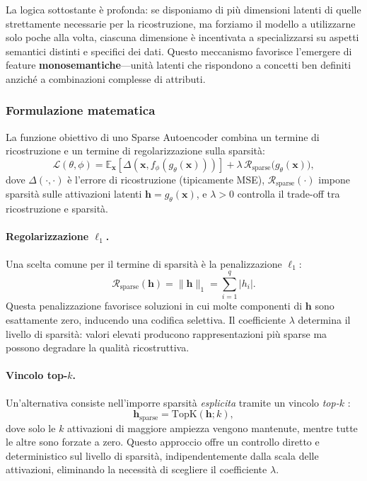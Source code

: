 La logica sottostante è profonda: se disponiamo di più dimensioni latenti di quelle strettamente necessarie per la ricostruzione, ma forziamo il modello a utilizzarne solo poche alla volta, ciascuna dimensione è incentivata a specializzarsi su aspetti semantici distinti e specifici dei dati. Questo meccanismo favorisce l'emergere di feature \textbf{monosemantiche}—unità latenti che rispondono a concetti ben definiti anziché a combinazioni complesse di attributi.


\subsubsection{Formulazione matematica}

La funzione obiettivo di uno Sparse Autoencoder combina un termine di ricostruzione e un termine di regolarizzazione sulla sparsità:
\begin{equation}
    \mathcal{L}(\theta, \phi)
    =
    \mathbb{E}_{\mathbf{x}}
    \left[
        \Delta\!\left(\mathbf{x}, f_\phi(g_\theta(\mathbf{x}))\right)
    \right]
    +
    \lambda \, \mathcal{R}_\text{sparse}\big(g_\theta(\mathbf{x})\big),
    \label{eq:sae_loss}
\end{equation}
dove $\Delta(\cdot, \cdot)$ è l'errore di ricostruzione (tipicamente MSE), $\mathcal{R}_\text{sparse}(\cdot)$ impone sparsità sulle attivazioni latenti $\mathbf{h} = g_\theta(\mathbf{x})$, e $\lambda > 0$ controlla il trade-off tra ricostruzione e sparsità.

\paragraph{Regolarizzazione $\ell_1$.} 
Una scelta comune per il termine di sparsità è la penalizzazione $\ell_1$:
\begin{equation}
    \mathcal{R}_\text{sparse}(\mathbf{h}) = \|\mathbf{h}\|_1 = \sum_{i=1}^{q} |h_i|.
    \label{eq:l1_sparsity}
\end{equation}
Questa penalizzazione favorisce soluzioni in cui molte componenti di $\mathbf{h}$ sono esattamente zero, inducendo una codifica selettiva. Il coefficiente $\lambda$ determina il livello di sparsità: valori elevati producono rappresentazioni più sparse ma possono degradare la qualità ricostruttiva.

\paragraph{Vincolo top-$k$.}
Un'alternativa consiste nell'imporre sparsità \textit{esplicita} tramite un vincolo \textit{top-$k$} \parencite{wang2024disentangledrepresentationlearning}:
\begin{equation}
    \mathbf{h}_{\text{sparse}} = \text{TopK}(\mathbf{h}; k),
    \label{eq:topk_sparsity}
\end{equation}
dove solo le $k$ attivazioni di maggiore ampiezza vengono mantenute, mentre tutte le altre sono forzate a zero. Questo approccio offre un controllo diretto e deterministico sul livello di sparsità, indipendentemente dalla scala delle attivazioni, eliminando la necessità di scegliere il coefficiente $\lambda$.

